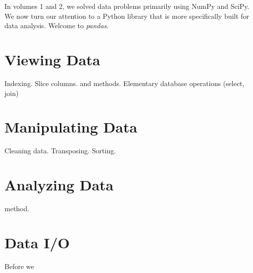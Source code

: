 
In volumes 1 and 2, we solved data problems primarily using NumPy and SciPy.
We now turn our attention to a Python library that is more specifically built for data
analysis. Welcome to \emph{pandas}.

\section*{Viewing Data}
Indexing.
Slice columns.
 and  methods.
Elementary database operations (select, join)

\section*{Manipulating Data}
Cleaning data. Transposing. Sorting.

\section*{Analyzing Data}
 method.

\section*{Data I/O}
Before we 
